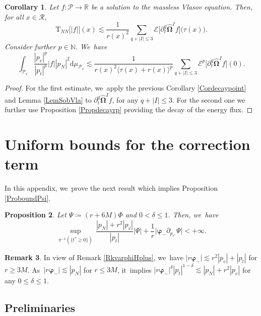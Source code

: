 \documentclass[JEP,XML,SOM,Unicode,published]{cedram}
\theoremstyle{plain}
\newtheorem{proposition}{Proposition}[section]
\newtheorem{corollary}[proposition]{Corollary}
\theoremstyle{definition}
\newtheorem{remark}[proposition]{Remark}
\newcommand\R{{\mathbb{R}}}
\newcommand\dr{{\mathrm{d}}}
\begin{document}
\begin{corollary}\label{Cordecay}
Let $f : \mathcal{P} \to \R$ be a solution to the massless Vlasov equation. Then, for all $x \in \mathcal{R}$,
\[
\mathrm{T}_{NN}\bigl[|f|\bigr] (x) \lesssim \frac{1}{r(x)^2} \sum_{q+|I| \leq 3} \mathcal{E}\bigl[ \partial_t^q \widehat{\mathbf{\Omega}}^I f \bigr] \bigl(\tau (x) \bigr).
\]
Consider further $p \in \mathbb{N}$. We~have
\[
\int_{\mathcal{P}_x} \frac{|p_v|^p}{|p_t|^p} |f| |p_N|^2 \dr \mu_{\mathcal{P}_x} \lesssim \frac{1}{r(x)^2 \langle \tau (x)+r(x) \rangle^p} \sum_{q+|I| \leq 3} \mathcal{E}^p\bigl[ \partial_t^q \widehat{\mathbf{\Omega}}^I f \bigr] (0).
\]
\end{corollary}
\begin{proof}
For the first estimate, we~apply the previous Corollary \ref{Cordecaypoint} and Lemma \ref{LemSobVla} to $ \partial_t^q \widehat{\mathbf{\Omega}}^I f$, for any $q+|I| \leq 3$. For the second one we further use Proposition \ref{Propdecayrp} providing the decay of the energy flux.
\end{proof}

\appendix

\section{Uniform bounds for the correction term}\label{Append}

In this appendix, we~prove the next result which implies Proposition \ref{ProboundPsi}.

\begin{proposition}\label{ProboundPsibis}
Let $\Psi \coloneqq (r+6M)\Phi$ and $0 < \delta \leq 1$. Then, we~have
\[
\sup_{ \pi^{-1} (\{t^* \geq 0 \})} \,\frac{|p_N|+r^2|p_v|}{|p_t|}|\Psi|+\frac{1}{r}\big|\pmb{\varphi}_- \partial_{p_{r^*}} \Psi \big| < +\infty.
\]
\end{proposition}
\begin{remark}\label{RkboundPsi}
In view of Remark \ref{RkvarphiHplus}, we~have $|r \pmb{\varphi}_-| \lesssim r^2|p_v|+|p_t|$ for $r \geq 3M$. As~$|r \pmb{\varphi}_-| \lesssim |p_N|$ for $r \leq 3M$, it~implies $|r \pmb{\varphi}_-|^\delta |p_t|^{1-\delta} \lesssim |p_N|+r^2|p_v|$ for any $0 \leq \delta \leq 1$.
\end{remark}

\subsection{Preliminaries}
\end{document}
